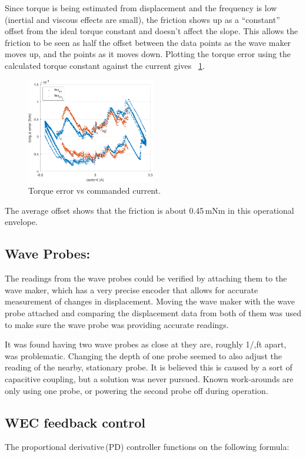 \documentclass[11pt, letterpaper]{article}
\begin{document}
Since torque is being estimated from displacement and the frequency is low (inertial and viscous effects are small), the friction shows up as a ``constant'' offset from the ideal torque constant and doesn't affect the slope.
This allows the friction to be seen as half the offset between the data points as the wave maker moves up, and the points as it moves down. 
Plotting the torque error using the calculated torque constant against the current gives \figurename~\ref{fig:TorqueError}.
\begin{figure}[tb]
  \centering
  \includegraphics[width=0.5\textwidth]{diagrams/TorqueError.pdf}
  \caption{Torque error vs commanded current.}
  \label{fig:TorqueError}
\end{figure}
The average offset shows that the friction is about 0.45\,mNm in this operational envelope.

\subsection{Wave Probes:}	\label{waveprobes}
The readings from the wave probes could be verified by attaching them to the wave maker, which has a very precise encoder that allows for accurate measurement of changes in displacement.
Moving the wave maker with the wave probe attached and comparing the displacement data from both of them was used to make sure the wave probe was providing accurate readings.

It was found having two wave probes as close at they are, roughly 1/,ft apart, was problematic.
Changing the depth of one probe seemed to also adjust the reading of the nearby, stationary probe.
It is believed this is caused by a sort of capacitive coupling, but a solution was never pursued.
Known work-arounds are only using one probe, or powering the second probe off during operation.

\subsection{WEC feedback control}
The proportional derivative\,(PD) controller functions on the following formula:
\end{document}

